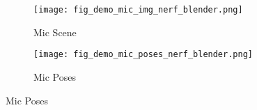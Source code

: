 
\begin{figure}[H]
    \centering
    \begin{subfigure}{0.48\linewidth}
        \texttt{[image: fig\_demo\_mic\_img\_nerf\_blender.png]}
        \caption{Mic Scene}
    \end{subfigure}
    \begin{subfigure}{0.48\linewidth}
        \texttt{[image: fig\_demo\_mic\_poses\_nerf\_blender.png]}
        \caption{Mic Poses}
    \end{subfigure}
    \label{fig:dataset_nerf_blender_mic}
\end{figure}

